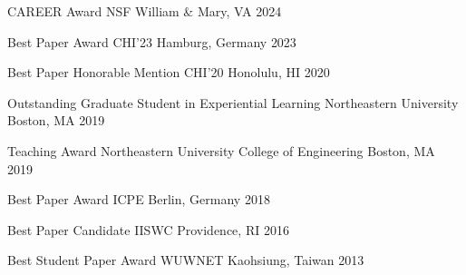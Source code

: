 
\begin{cvhonors}
    \cvhonor
    {CAREER Award}
    {NSF}
    {William \& Mary, VA}
    {2024}

    \cvhonor
    {Best Paper Award}
    {CHI'23}
    {Hamburg, Germany}
    {2023}


    \cvhonor
    {Best Paper Honorable Mention}
    {CHI'20}
    {Honolulu, HI}
    {2020}

    \cvhonor
    {Outstanding Graduate Student in Experiential Learning}
    {Northeastern University}
    {Boston, MA}
    {2019}

    \cvhonor
    {Teaching Award}
    {Northeastern University College of Engineering}
    {Boston, MA}
    {2019}

    \cvhonor
    {Best Paper Award}
    {ICPE}
    {Berlin, Germany}
    {2018}

    \cvhonor
    {Best Paper Candidate}
    {IISWC}
    {Providence, RI}
    {2016}

    \cvhonor
    {Best Student Paper Award}
    {WUWNET}
    {Kaohsiung, Taiwan}
    {2013}



\end{cvhonors}
